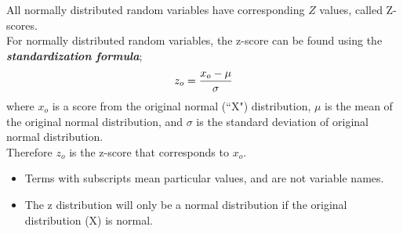 \documentclass[]{report}
\begin{document}




All normally distributed random variables have corresponding $Z$ values, called Z-scores.\\
\bigskip
For normally distributed random variables, the z-score can be found using the \textbf{\emph{standardization formula}};
\[z_o = { x_o - \mu \over \sigma}\]
where $x_o$ is a score from the original normal (``X") distribution, $\mu$ is the mean of the original normal distribution, and $\sigma$ is the standard deviation of original normal distribution.\\
\bigskip
Therefore $z_o$ is the z-score that corresponds to $x_o$.

\begin{itemize}
\item Terms with subscripts mean particular values, and are not variable names.
\item The z distribution will only be a normal distribution if the original distribution (X) is normal.
\end{itemize}



\end{document}
